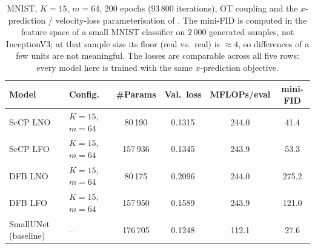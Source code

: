 \begin{table}[h]
\centering\small
\begin{tabular}{llcccc}
\toprule
Model & Config. & \#Params & Val.\ loss & MFLOPs/eval & mini-FID \\
\midrule
ScCP LNO & $K{=}15$, $m{=}64$ & 80\,190 & 0.1315 & 244.0 & 41.4 \\
ScCP LFO & $K{=}15$, $m{=}64$ & 157\,936 & 0.1345 & 243.9 & 53.3 \\
DFB LNO & $K{=}15$, $m{=}64$ & 80\,175 & 0.2096 & 244.0 & 275.2 \\
DFB LFO & $K{=}15$, $m{=}64$ & 157\,950 & 0.1589 & 243.9 & 121.0 \\
SmallUNet (baseline) & -- & 176\,705 & 0.1248 & 112.1 & 27.6 \\
\bottomrule
\end{tabular}
\caption{MNIST, $K=15$, $m=64$, 200 epochs ($93\,800$ iterations), OT coupling and
the $x$-prediction / velocity-loss parameterisation of . The
mini-FID is computed in the feature space of a small MNIST classifier on $2\,000$
generated samples, not InceptionV3; at that sample size its floor (real vs.\ real) is
$\approx 4$, so differences of a few units are not meaningful. The losses are comparable
across all five rows: every model here is trained with the same $x$-prediction objective.}
\label{tab:mnist_k15_200ep}
\end{table}

